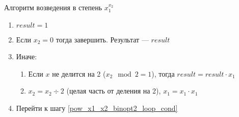 Алгоритм возведения в степень $x_1^{x_2}$
\begin{enumerate}
 \item $result = 1$
 \item \label{pow_x1_x2_binopt2_loop_cond} Если $x_2=0$ тогда завершить. Результат --- $result$
 \item Иначе:
 \begin{enumerate}
  \item Если $x$ не делится на 2 ($x_2 \mod 2 = 1$), тогда $result = result \cdot x_1$
  \item $x_2 = x_2 \div 2$ (целая часть от деления на 2), $x_1 = x_1 \cdot x_1$
 \end{enumerate}
 \item Перейти к шагу \ref{pow_x1_x2_binopt2_loop_cond}
\end{enumerate}
